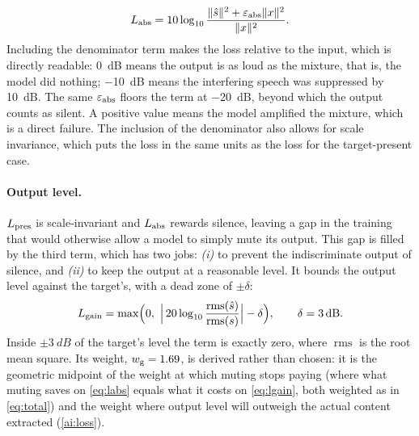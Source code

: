 \begin{equation}
L_\textup{abs} = 10 \log_{10}
  \frac{\lVert \hat{s} \rVert^2 + \varepsilon_\textup{abs} \lVert x \rVert^2}
       {\lVert x \rVert^2}.
\label{eq:labs}
\end{equation}
 Including the denominator term makes the loss relative to the input, which is directly readable: \SI{0}{dB} means the output is as loud as the mixture, that is, the model did nothing; \SI{-10}{dB} means the interfering speech was suppressed by \SI{10}{dB}. The same $\varepsilon_\textup{abs}$ floors the term at \SI{-20}{dB}, beyond which the output counts as silent. A positive value means the
model amplified the mixture, which is a direct failure. The inclusion of the denominator also allows for scale invariance, which puts the loss in the same units as the loss for the target-present case.


\paragraph{Output level.}
$L_\textup{pres}$ is scale-invariant and $L_\textup{abs}$ rewards silence, leaving a gap in the training that would otherwise allow a model to simply mute its output. This gap is filled by the third term, which has two jobs: \textit{(i)} to prevent the indiscriminate output of silence, and \textit{(ii)} to keep the output at a reasonable level. It bounds the output level against the target's, with a dead zone of $\pm\delta$:
\begin{equation}
L_\textup{gain} = \max\!\Big(0,\ \Big|\, 20 \log_{10} \frac{\operatorname{rms}(\hat{s})}{\operatorname{rms}(s)} \Big| - \delta \Big),
\qquad \delta = \SI{3}{dB}.
\label{eq:lgain}
\end{equation}
Inside $\pm\SI{3}{dB}$ of the target's level the term is exactly zero, where $\operatorname{rms}$ is the root mean square. Its weight, $w_\textup{g} = 1.69$, is derived rather than chosen: it is the geometric midpoint of the weight at which muting stops paying (where what muting saves on \eqref{eq:labs} equals what it costs on \eqref{eq:lgain}, both weighted as in \eqref{eq:total}) and the weight where output level will outweigh the actual content extracted (\ref{ai:loss}).


